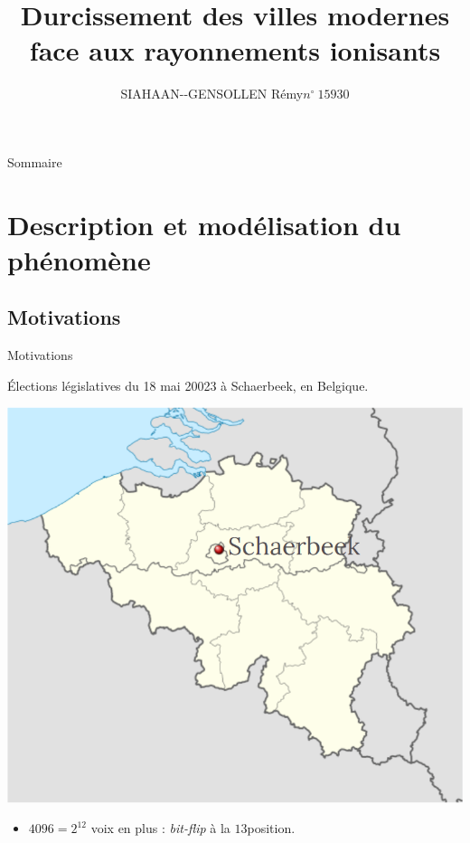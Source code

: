 \documentclass[french,bookmarks,aspectratio=43]{beamer}
\title{Durcissement des villes modernes face aux rayonnements ionisants}
\author{SIAHAAN-{}-GENSOLLEN Rémy\qquad $n^\circ\ 15930$}
\institute{Rapport de TIPE 2023, MPI}
\date{}
\begin{document}
\frame{\titlepage}

\begin{frame}{Sommaire}
    \tableofcontents
\end{frame}

\section{Description et modélisation du phénomène}

\subsection{Motivations}

\begin{frame}{Motivations}


    Élections législatives du 18 mai 20023 à Schaerbeek, en Belgique.\medskip
    
    \pause

    \begin{center}
        \includegraphics[scale=0.35]{../Images/Schaerbeek.png}
    \end{center}

    \pause 
    
    \begin{itemize}
        \item $4096 = 2^{12}$ voix en plus : \emph{bit-flip} à la $13$\ieme position.
    \end{itemize}
\end{frame}
\end{document}
